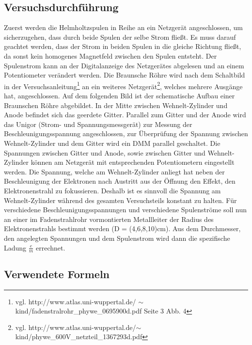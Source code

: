 \documentclass[12pt,a4paper]{article}
\begin{document}
\subsection{Versuchsdurchführung}
Zuerst werden die Helmholtzspulen in Reihe an ein Netzgerät angeschlossen, um sicherzugehen, dass durch beide Spulen der selbe Strom fließt. Es muss darauf geachtet werden, dass der Strom in beiden Spulen in die gleiche Richtung fließt, da sonst kein homogenes Magnetfeld zwischen den Spulen entsteht. Der Spulenstrom kann an der Digitalanzeige des Netzgerätes abgelesen und an einem Potentiometer verändert werden. Die Braunsche Röhre wird nach dem Schaltbild in der Versuchsanleitung\footnote{vgl. http://www.atlas.uni-wuppertal.de/
$\sim$kind/fadenstralrohr\_phywe\_0695900d.pdf Seite 3 Abb. 4} an ein weiteres Netzgerät\footnote{vgl. http://www.atlas.uni-wuppertal.de/$\sim$kind/phywe\_600V\_netzteil\_1367293d.pdf}, welches mehrere Ausgänge hat, angeschlossen. Auf dem folgenden Bild ist der schematische Aufbau einer Braunschen Röhre abgebildet.
In der Mitte zwischen Wehnelt-Zylinder und Anode befindet sich das geerdete Gitter. Parallel zum Gitter und der Anode wird das Unigor (Strom- und Spannungsmessgerät) zur Messung der Beschleunigungsspannung angeschlossen, zur Überprüfung der Spannung zwischen Wehnelt-Zylinder und dem Gitter wird ein DMM parallel geschaltet. Die Spannungen zwischen Gitter und Anode, sowie zwischen Gitter und Wehnelt-Zylinder können am Netzgerät mit entsprechenden Potentiometern eingestellt werden. Die Spannung, welche am Wehnelt-Zylinder anliegt hat neben der Beschleunigung der Elektronen nach Austritt aus der Öffnung den Effekt, den Elektronenstrahl zu fokussieren. Deshalb ist es sinnvoll die Spannung am Wehnelt-Zylinder während des gesamten Versuchsteils konstant zu halten. Für verschiedene Beschleunigungsspannungen und verschiedene Spulenströme soll nun an einer im Fadenstrahlrohr vormontierten Metallleiter der Radius des Elektronenstrahls bestimmt werden (D = (4,6,8,10)cm). Aus dem Durchmesser, den angelegten Spannungen und dem Spulenstrom wird dann die spezifische Ladung $\frac{e}{m}$ errechnet.
\subsection{Verwendete Formeln}
\end{document}

